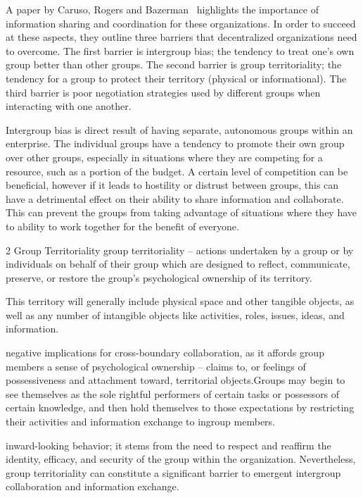A paper by Caruso, Rogers and Bazerman~\cite{caruso2008boundaries} highlights the importance of information sharing and coordination for these organizations. In order to succeed at these aspects, they outline three barriers that decentralized organizations need to overcome. The first barrier is intergroup bias; the tendency to treat one's own group better than other groups. The second barrier is group territoriality; the tendency for a group to protect their territory (physical or informational). The third barrier is poor negotiation strategies used by different groups when interacting with one another. 

Intergroup bias is direct result of having separate, autonomous groups within an enterprise. The individual groups have a tendency to promote their own group over other groups, especially in situations where they are competing for a resource, such as a portion of the budget. A certain level of competition can be beneficial, however if it leads to hostility or distrust between groups, this can have a detrimental effect on their ability to share information and collaborate. This can prevent the groups from taking advantage of situations where they have to ability to work together for the benefit of everyone. 

    
    
    2 Group Territoriality
group territoriality – actions undertaken by a group or by individuals on behalf of their group which are designed to reflect, communicate, preserve, or restore the group’s psychological ownership of its territory.

This territory will generally include physical space and other tangible objects, as well as any number of intangible objects like activities, roles, issues, ideas, and information.

negative implications for cross-boundary collaboration, as it affords group members a sense of psychological ownership – claims to, or feelings of possessiveness and attachment toward, territorial objects.Groups may begin to see themselves as the sole rightful performers of certain tasks or possessors of certain knowledge, and then hold themselves to those expectations by restricting their activities and information exchange to ingroup members.

inward-looking behavior; it stems from the need to respect and reaffirm the identity, efficacy, and security of the group within the organization. Nevertheless, group territoriality can constitute a significant barrier to emergent intergroup collaboration and information exchange.

